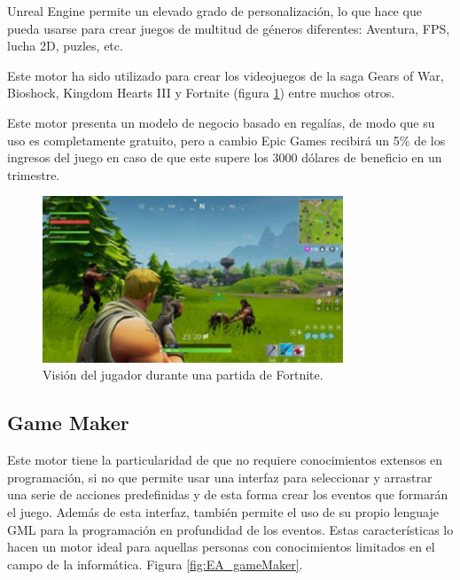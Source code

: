 Unreal Engine permite un elevado grado de personalización, lo que hace que pueda usarse para crear juegos de multitud de géneros diferentes: Aventura, FPS, lucha 2D, puzles, etc.

Este motor ha sido utilizado para crear los videojuegos de la saga Gears of War, Bioshock, Kingdom Hearts III y Fortnite (figura \ref{fig:EA_fortnite}) entre muchos otros.

Este motor presenta un modelo de negocio basado en regalías, de modo que su uso es completamente gratuito, pero a cambio Epic Games recibirá un 5\% de los ingresos del juego en caso de que este supere los 3000 dólares de beneficio en un trimestre.




\begin{figure}[H]
  \centering
\includegraphics[width=0.8\textwidth]{03.EstudioProblema/01.EstadoArte/00.Figuras/29.fortnite.jpg}
    \caption{Visión del jugador durante una partida de Fortnite. \cite{EA_img_fortnite}}
    \label{fig:EA_fortnite}
\end{figure}





\subsection{Game Maker}

Este motor tiene la particularidad de que no requiere conocimientos extensos en programación, si no que permite usar una interfaz para seleccionar y arrastrar una serie de acciones predefinidas y de esta forma crear los eventos que formarán el juego. Además de esta interfaz, también permite el uso de su propio lenguaje GML para la programación en profundidad de los eventos. Estas características lo hacen un motor ideal para aquellas personas con conocimientos limitados en el campo de la informática. Figura \ref{fig:EA_gameMaker}.

